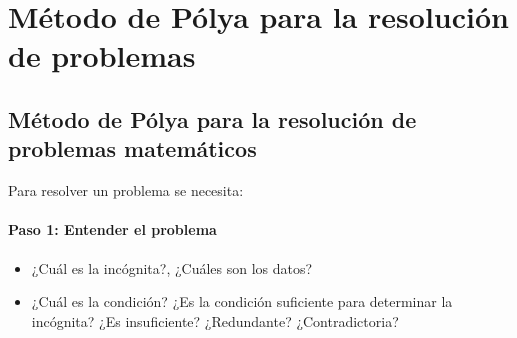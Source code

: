 \chapter{Método de Pólya para la resolución de problemas}
\label{Polya}

\section{Método de Pólya para la resolución de problemas matemáticos}

\noindent Para resolver un problema se necesita:
\subsubsection*{Paso 1: Entender el problema}
\begin{itemize}
\item ¿Cuál es la incógnita?, ¿Cuáles son los datos?
\item ¿Cuál es la condición? ¿Es la condición suficiente para determinar la
  incógnita? ¿Es insuficiente? ¿Redundante? ¿Contradictoria? 
\end{itemize}

